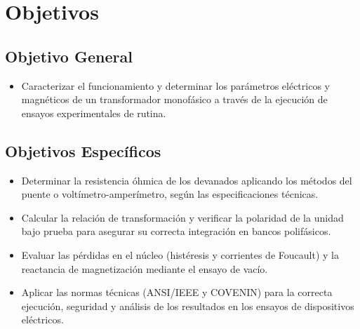 \section{Objetivos}
\subsection*{ Objetivo General}
\begin{itemize}
    \item Caracterizar el funcionamiento y determinar los parámetros eléctricos y magnéticos de un transformador monofásico a través de la ejecución de ensayos experimentales de rutina.
\end{itemize}

\subsection*{ Objetivos Específicos}
\begin{itemize}
    \item Determinar la resistencia óhmica de los devanados aplicando los métodos del puente o voltímetro-amperímetro, según las especificaciones técnicas.
    \item Calcular la relación de transformación y verificar la polaridad de la unidad bajo prueba para asegurar su correcta integración en bancos polifásicos.
    \item Evaluar las pérdidas en el núcleo (histéresis y corrientes de Foucault) y la reactancia de magnetización mediante el ensayo de vacío.
    \item Aplicar las normas técnicas (ANSI/IEEE y COVENIN) para la correcta ejecución, seguridad y análisis de los resultados en los ensayos de dispositivos eléctricos.
\end{itemize}